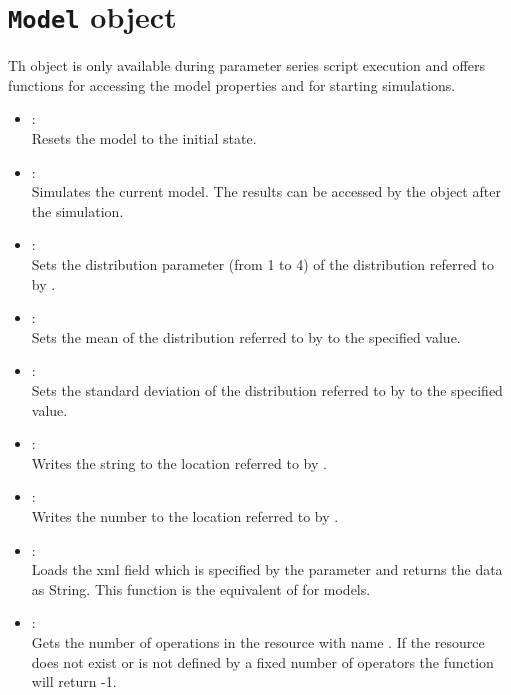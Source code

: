 \chapter{\texttt{Model} object}

Th  object is only available during parameter series
script execution and offers functions for accessing the model
properties and for starting simulations.

\begin{itemize}

\item
{}:\\
Resets the model to the initial state.

\item
{}:\\
Simulates the current model.
The results can be accessed by the  object after the simulation.

\item
{}:\\
Sets the distribution parameter  (from 1 to 4) of the distribution referred
to by .

\item
{}:\\
Sets the mean of the distribution referred to by  to the specified value.

\item
{}:\\
Sets the standard deviation of the distribution referred to by  to the specified value.  

\item
{}:\\
Writes the string  to the location referred to by .

\item
{}:\\
Writes the number  to the location referred to by .

\item
{}:\\
Loads the xml field which is specified by the parameter and returns the data 
as String. This function is the equivalent of  for models.

\item
{}:\\
Gets the number of operations in the resource with name .
If the resource does not exist or is not defined by a fixed number of operators
the function will return -1.


\end{itemize}
